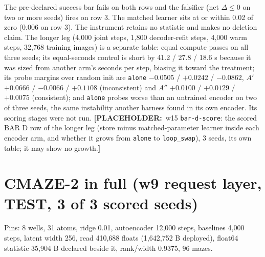 \documentclass{article} %
\newcommand{\PLACEHOLDER}[1]{{\color{red}\textbf{[PLACEHOLDER:}~#1\textbf{]}}}
\begin{document}
\noindent The pre-declared success bar fails on both rows and the falsifier (net $\Delta\le0$ on two
or more seeds) fires on row 3. The matched learner sits at or within 0.02 of zero (0.006 on row 3).
The instrument retains no statistic and makes no deletion claim. %
The longer leg (4,000 joint steps, 1,800 decoder-refit steps, 4,000 warm steps, 32,768 training
images) is a separate table: equal compute passes on all three seeds; its equal-seconds control is
short by 41.2 / 27.8 / 18.6 s because it was sized from another arm's seconds per step, biasing it
toward the treatment; its probe margins over random init are \texttt{alone} $-0.0505$ / $+0.0242$ /
$-0.0862$, $A'$ $+0.0666$ / $-0.0066$ / $+0.1108$ (inconsistent) and $A''$ $+0.0100$ / $+0.0129$ /
$+0.0075$ (consistent); and \texttt{alone} probes worse than an untrained encoder on two of three
seeds, the same instability another harness found in its own encoder. Its scoring stages were not
run. %
\PLACEHOLDER{w15 \texttt{bar-d-score}: the scored BAR D row of the longer leg (store minus
matched-parameter learner inside each encoder arm, and whether it grows from \texttt{alone} to
\texttt{loop\_swap}), 3 seeds, its own table; it may show no growth.}

\section{CMAZE-2 in full (w9 request layer, TEST, 3 of 3 scored seeds)}
\label{app:cmaze2}

Pins: 8 wells, 31 atoms, ridge 0.01, autoencoder 12,000 steps, baselines 4,000 steps, latent width
256, read 410,688 floats (1,642,752 B deployed), float64 statistic 35,904 B declared beside it,
rank/width 0.9375, 96 mazes. %
\end{document}
